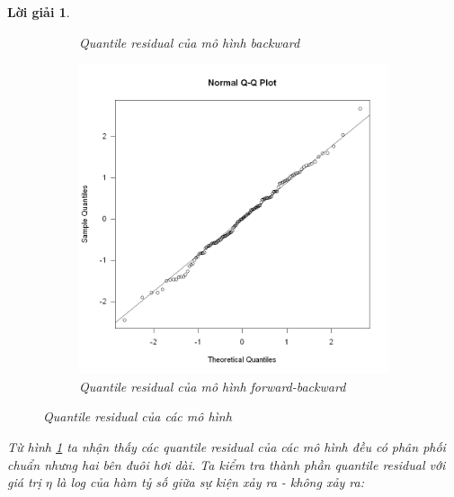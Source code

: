 \documentclass[14pt, a4paper]{article}
\theoremstyle{sltheorem}
\theoremstyle{soltheorem}
\newtheorem*{loigiai}{Lời giải}
\begin{document}
\begin{loigiai}
\begin{figure}[h!]
\begin{subfigure}[b]{0.4\textwidth}
            \caption{Quantile residual của mô hình backward}
        \end{subfigure}
        \hfill
        \begin{subfigure}[b]{0.4\textwidth}
            \centering
            \includegraphics[width=\textwidth]{figures/mbo_quantile_resid.png}
            \caption{Quantile residual của mô hình forward-backward}
        \end{subfigure}
        \caption{Quantile residual của các mô hình}
        \label{fig:Quantile-residual}
    \end{figure}
    Từ hình \ref{fig:Quantile-residual} ta nhận thấy các quantile residual của các mô hình đều có phân phối chuẩn nhưng hai bên đuôi hơi dài.
    Ta kiểm tra thành phần quantile residual với giá trị $\eta$ là log của hàm tỷ số giữa sự kiện xảy ra - không xảy ra:


\end{loigiai}
\end{document}
